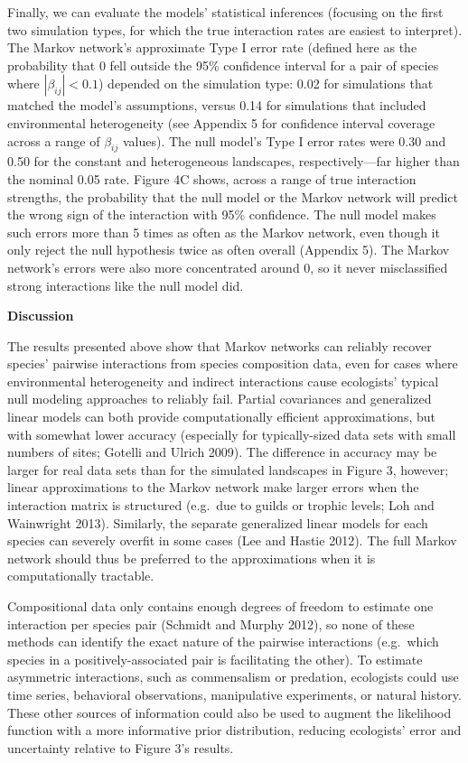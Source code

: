 \documentclass[12pt,]{article}
\begin{document}
\begin{spacing}{1.9}
\begin{flushleft}
Finally, we can evaluate the models' statistical inferences (focusing on
the first two simulation types, for which the true interaction rates are
easiest to interpret). The Markov network's approximate Type I error
rate (defined here as the probability that 0 fell outside the 95\%
confidence interval for a pair of species where \(|\beta_{ij}|<0.1\))
depended on the simulation type: 0.02 for simulations that matched the
model's assumptions, versus 0.14 for simulations that included
environmental heterogeneity (see Appendix 5 for confidence interval
coverage across a range of \(\beta_{ij}\) values). The null model's Type
I error rates were 0.30 and 0.50 for the constant and heterogeneous
landscapes, respectively---far higher than the nominal 0.05 rate. Figure
4C shows, across a range of true interaction strengths, the probability
that the null model or the Markov network will predict the wrong sign of
the interaction with 95\% confidence. The null model makes such errors
more than 5 times as often as the Markov network, even though it only
reject the null hypothesis twice as often overall (Appendix 5). The
Markov network's errors were also more concentrated around 0, so it
never misclassified strong interactions like the null model did.

\noindent
\textbf{Discussion}

\noindent
The results presented above show that Markov networks can reliably
recover species' pairwise interactions from species composition data,
even for cases where environmental heterogeneity and indirect
interactions cause ecologists' typical null modeling approaches to
reliably fail. Partial covariances and generalized linear models can
both provide computationally efficient approximations, but with somewhat
lower accuracy (especially for typically-sized data sets with small
numbers of sites; Gotelli and Ulrich 2009). The difference in accuracy
may be larger for real data sets than for the simulated landscapes in
Figure 3, however; linear approximations to the Markov network make
larger errors when the interaction matrix is structured (e.g.~due to
guilds or trophic levels; Loh and Wainwright 2013). Similarly, the
separate generalized linear models for each species can severely overfit
in some cases (Lee and Hastie 2012). The full Markov network should thus
be preferred to the approximations when it is computationally tractable.

Compositional data only contains enough degrees of freedom to estimate
one interaction per species pair (Schmidt and Murphy 2012), so none of
these methods can identify the exact nature of the pairwise interactions
(e.g.~which species in a positively-associated pair is facilitating the
other). To estimate asymmetric interactions, such as commensalism or
predation, ecologists could use time series, behavioral observations,
manipulative experiments, or natural history. These other sources of
information could also be used to augment the likelihood function with a
more informative prior distribution, reducing ecologists' error and
uncertainty relative to Figure 3's results.


\end{flushleft}
\end{spacing}
\end{document}
